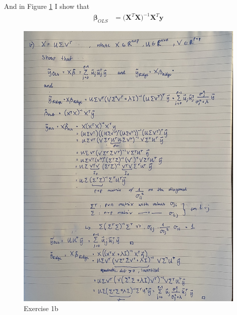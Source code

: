 And in Figure \ref{fig:ex36-3} I show that 
\begin{align*}
    \mathbf{\beta}_{OLS} &= \big( \mathbf{X}^{T} \mathbf{X} \big)^{-1} \mathbf{X}^{T} \mathbf{y}
\end{align*}

\begin{figure}[h!]
    \centering
    \includegraphics[width=0.7\linewidth]{latex/figures/ex36-3.jpeg}
    \caption{Exercise 1b}
    \label{fig:ex36-3}
\end{figure}

